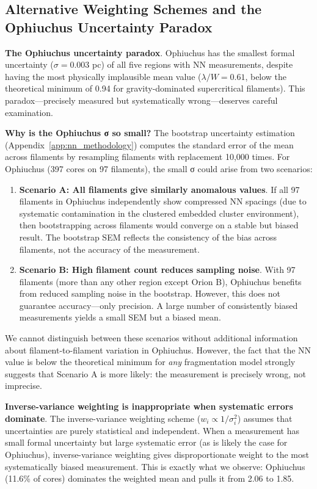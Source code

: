 \documentclass[twoside,twocolumn]{mnras}
\begin{document}
\subsection{Alternative Weighting Schemes and the Ophiuchus Uncertainty Paradox}

\textbf{The Ophiuchus uncertainty paradox}. Ophiuchus has the smallest formal uncertainty ($\sigma = 0.003$ pc) of all five regions with NN measurements, despite having the most physically implausible mean value ($\lambda/W = 0.61$, below the theoretical minimum of 0.94 for gravity-dominated supercritical filaments). This paradox---precisely measured but systematically wrong---deserves careful examination.

\textbf{Why is the Ophiuchus σ so small?} The bootstrap uncertainty estimation (Appendix~\ref{app:nn_methodology}) computes the standard error of the mean across filaments by resampling filaments with replacement 10,000 times. For Ophiuchus (397 cores on 97 filaments), the small σ could arise from two scenarios:

\begin{enumerate}
    \item \textbf{Scenario A: All filaments give similarly anomalous values}. If all 97 filaments in Ophiuchus independently show compressed NN spacings (due to systematic contamination in the clustered embedded cluster environment), then bootstrapping across filaments would converge on a stable but biased result. The bootstrap SEM reflects the consistency of the bias across filaments, not the accuracy of the measurement.

    \item \textbf{Scenario B: High filament count reduces sampling noise}. With 97 filaments (more than any other region except Orion B), Ophiuchus benefits from reduced sampling noise in the bootstrap. However, this does not guarantee accuracy---only precision. A large number of consistently biased measurements yields a small SEM but a biased mean.
\end{enumerate}

We cannot distinguish between these scenarios without additional information about filament-to-filament variation in Ophiuchus. However, the fact that the NN value is below the theoretical minimum for \textit{any} fragmentation model strongly suggests that Scenario A is more likely: the measurement is precisely wrong, not imprecise.

\textbf{Inverse-variance weighting is inappropriate when systematic errors dominate}. The inverse-variance weighting scheme ($w_i \propto 1/\sigma_i^2$) assumes that uncertainties are purely statistical and independent. When a measurement has small formal uncertainty but large systematic error (as is likely the case for Ophiuchus), inverse-variance weighting gives disproportionate weight to the most systematically biased measurement. This is exactly what we observe: Ophiuchus (11.6\% of cores) dominates the weighted mean and pulls it from 2.06 to 1.85.
\end{document}
